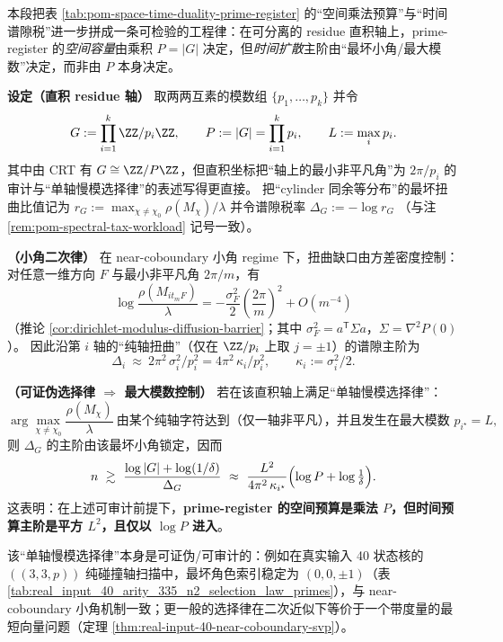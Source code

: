 \begin{remark}\label{rem:pom-max-modulus-control-law}
本段把表 \ref{tab:pom-space-time-duality-prime-register} 的“空间乘法预算”与“时间谱隙税”进一步拼成一条可检验的工程律：在可分离的 residue 直积轴上，prime-register 的\emph{空间容量}由乘积 \(P=|G|\) 决定，但\emph{时间扩散}主阶由“最坏小角/最大模数”决定，而非由 \(P\) 本身决定。
\par
\medskip\noindent\textbf{设定（直积 residue 轴）}
取两两互素的模数组 \(\{p_1,\dots,p_k\}\) 并令
\[
G:=\prod_{i=1}^k\ZZ/p_i\ZZ,
\qquad
P:=|G|=\prod_{i=1}^k p_i,
\qquad
L:=\max_i p_i.
\]
其中由 CRT 有 \(G\cong \ZZ/P\ZZ\)，但直积坐标把“轴上的最小非平凡角”为 \(2\pi/p_i\) 的审计与“单轴慢模选择律”的表述写得更直接。
把“cylinder 同余等分布”的最坏扭曲比值记为
\(
r_G:=\max_{\chi\neq\chi_0}\rho(M_\chi)/\lambda
\)
并令谱隙税率
\(
\Delta_G:=-\log r_G
\)
（与注 \ref{rem:pom-spectral-tax-workload} 记号一致）。
\par
\medskip\noindent\textbf{（小角二次律）}
在 near-coboundary 小角 regime 下，扭曲缺口由方差密度控制：对任意一维方向 \(F\) 与最小非平凡角 \(2\pi/m\)，有
\[
\log\frac{\rho(M_{it_mF})}{\lambda}
=-\frac{\sigma_F^2}{2}\left(\frac{2\pi}{m}\right)^2+O(m^{-4})
\]
（推论 \ref{cor:dirichlet-modulus-diffusion-barrier}；其中 \(\sigma_F^2=a^{\mathsf T}\Sigma a\)，\(\Sigma=\nabla^2P(0)\)）。
因此沿第 \(i\) 轴的“纯轴扭曲”（仅在 \(\ZZ/p_i\) 上取 \(j=\pm1\)）的谱隙主阶为
\[
\Delta_i\ \approx\ 2\pi^2\,\sigma_i^2/p_i^2
=4\pi^2\,\kappa_i/p_i^2,
\qquad \kappa_i:=\sigma_i^2/2.
\]
\par
\medskip\noindent\textbf{（可证伪选择律 \(\Rightarrow\) 最大模数控制）}
若在该直积轴上满足“单轴慢模选择律”：
\[
\arg\max_{\chi\neq\chi_0}\frac{\rho(M_\chi)}{\lambda}
\ \text{由某个纯轴字符达到（仅一轴非平凡），并且发生在最大模数 }p_{i^\star}=L,
\]
则 \(\Delta_G\) 的主阶由该最坏小角锁定，因而
\[
n\ \gtrsim\ \frac{\log|G|+\log(1/\delta)}{\Delta_G}
\ \approx\
\frac{L^2}{4\pi^2\,\kappa_{i^\star}}\Bigl(\log P+\log\tfrac{1}{\delta}\Bigr).
\]
这表明：在上述可审计前提下，\textbf{prime-register 的空间预算是乘法 \(P\)，但时间预算主阶是平方 \(L^2\)，且仅以 \(\log P\) 进入}。
\par
该“单轴慢模选择律”本身是可证伪/可审计的：例如在真实输入 40 状态核的 \(((3,3,p))\) 纯碰撞轴扫描中，最坏角色索引稳定为 \((0,0,\pm1)\)（表 \ref{tab:real_input_40_arity_335_n2_selection_law_primes}），与 near-coboundary 小角机制一致；更一般的选择律在二次近似下等价于一个带度量的最短向量问题（定理 \ref{thm:real-input-40-near-coboundary-svp}）。
\end{remark}

